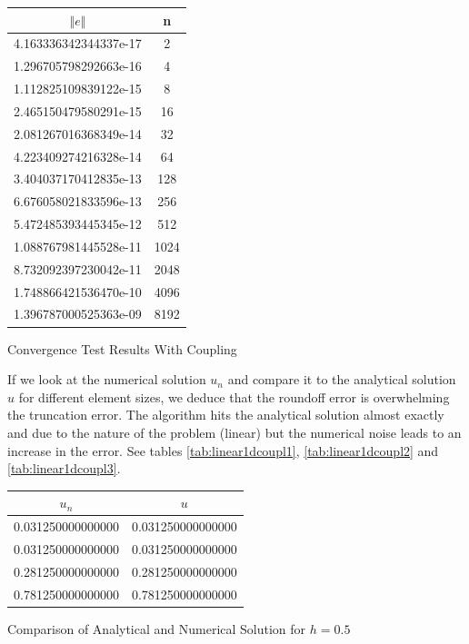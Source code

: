 \documentclass[a4paper,12pt]{article}
\makeatletter
\newenvironment{tablehere}
  {\def\@captype{table}}
  {}
\makeatother
\begin{document}
\begin{center}
\begin{tablehere}
\begin{tabular}{cc}
 $\Vert e \Vert$ & n \\
\hline
\hline
4.163336342344337e-17 & 2\\
1.296705798292663e-16 & 4 \\
1.112825109839122e-15 & 8 \\
2.465150479580291e-15 & 16\\
2.081267016368349e-14 & 32 \\
4.223409274216328e-14 & 64 \\
3.404037170412835e-13 & 128\\
6.676058021833596e-13 & 256\\
5.472485393445345e-12 & 512\\
1.088767981445528e-11 & 1024\\
8.732092397230042e-11 & 2048\\
1.748866421536470e-10 & 4096\\
1.396787000525363e-09 & 8192
\end{tabular}
\caption{Convergence Test Results With Coupling}\label{tab:quadratic1d}
\end{tablehere}
\end{center}
If we look at the numerical solution $u_n$ and compare it to the analytical solution $u$ for different element sizes, we deduce that the roundoff error is overwhelming the truncation error. The algorithm hits the analytical solution almost exactly and due to the nature of the problem (linear) but the numerical noise leads to an increase in the error. See tables \ref{tab:linear1dcoupl1}, \ref{tab:linear1dcoupl2} and \ref{tab:linear1dcoupl3}.\\
\begin{center}
\begin{tablehere}
\centering
\begin{tabular}{cc}
 $ u_n $ & $u$ \\
\hline
\hline
0.031250000000000 & 0.031250000000000\\
0.031250000000000 & 0.031250000000000\\
0.281250000000000 & 0.281250000000000\\
0.781250000000000 & 0.781250000000000\\
\end{tabular}
\caption{Comparison of Analytical and Numerical Solution for $h = 0.5$}\label{tab:linear1dcoupl1}
\end{tablehere}
\end{center}
\end{document}
